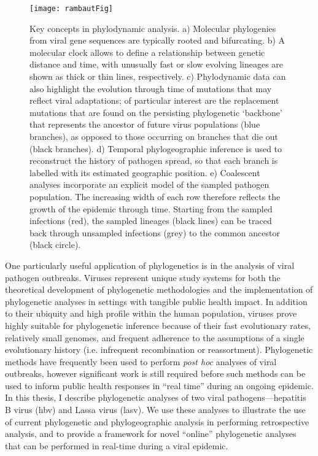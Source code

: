 \begin{figure}[ht]
  \centering
  \medskip
  \texttt{[image: rambautFig]}
  \caption[Applications of phylogenetic analysis]{Key concepts in phylodynamic analysis. 
  a) Molecular phylogenies from viral gene sequences are typically rooted and bifurcating.
  b) A molecular clock allows to define a relationship between genetic distance and time, with unusually fast or slow evolving lineages are shown as thick or thin lines, respectively.
  c) Phylodynamic data can also highlight the evolution through time of mutations that may reflect viral adaptations; of particular interest are the replacement mutations that are found on the persisting phylogenetic ‘backbone’ that represents the ancestor of future virus populations (blue branches), as opposed to those occurring on branches that die out (black branches).
  d) Temporal phylogeographic inference is used to reconstruct the history of pathogen spread, so that each branch is labelled with its estimated geographic position.
  e) Coalescent analyses incorporate an explicit model of the sampled pathogen population.
  The increasing width of each row therefore reflects the growth of the epidemic through time. Starting from the sampled infections (red), the sampled lineages (black lines) can be traced back through unsampled infections (grey)
to the common ancestor (black circle).}
  \label{fig:phylogeneticsOverview}
\end{figure}


One particularly useful application of phylogenetics is in the analysis of viral pathogen outbreaks.
Viruses represent unique study systems for both the theoretical development of phylogenetic methodologies and the implementation of phylogenetic analyses in settings with tangible public health impact.
In addition to their ubiquity and high profile within the human population, viruses prove highly suitable for phylogenetic inference because of their fast evolutionary rates, relatively small genomes, and frequent adherence to the assumptions of a single evolutionary history (i.e. infrequent recombination or reassortment). %
Phylogenetic methods have frequently been used to perform \textit{post hoc} analyses of viral outbreaks, however significant work is still required before such methods can be used to inform public health responses in ``real time'' during an ongoing epidemic.
In this thesis, I describe phylogenetic analyses of two viral pathogens---hepatitis B virus (\gls{hbv}) and Lassa virus (\gls{lasv}).
We use these analyses to illustrate the use of current phylogenetic and phylogeographic analysis in performing retrospective analysis, and to provide a framework for novel ``online'' phylogenetic analyses that can be performed in real-time during a viral epidemic.



